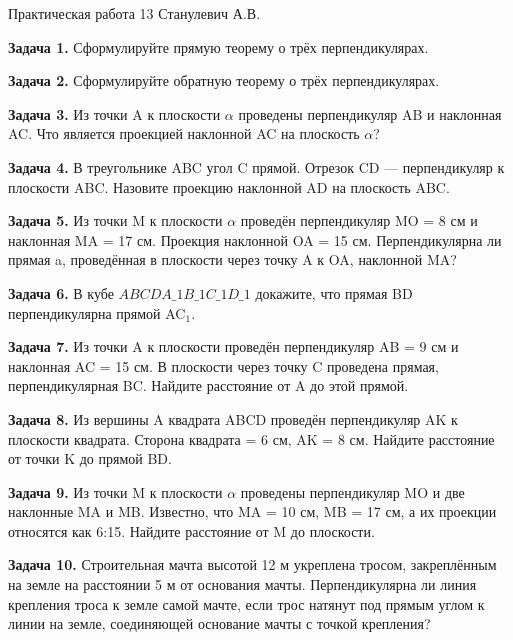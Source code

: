 \documentclass{umk-matematika}
\begin{document}
\maketitlepage
    {Практическая работа 13}
    {}
    {Станулевич А.В.}

\textbf{Задача 1.} Сформулируйте прямую теорему о трёх перпендикулярах.\par\vspace{10pt}
\textbf{Задача 2.} Сформулируйте обратную теорему о трёх перпендикулярах.\par\vspace{10pt}
\textbf{Задача 3.} Из точки A к плоскости $\alpha$ проведены перпендикуляр AB и наклонная AC. Что является проекцией наклонной AC на плоскость $\alpha$?\par\vspace{10pt}
\textbf{Задача 4.} В треугольнике ABC угол C прямой. Отрезок CD — перпендикуляр к плоскости ABC. Назовите проекцию наклонной AD на плоскость ABC.\par\vspace{10pt}
\textbf{Задача 5.} Из точки M к плоскости $\alpha$ проведён перпендикуляр MO = 8 см и наклонная MA = 17 см. Проекция наклонной OA = 15 см. Перпендикулярна ли прямая a, проведённая в плоскости через точку A к OA, наклонной MA?\par\vspace{10pt}
\textbf{Задача 6.} В кубе $ABCDA\_1B\_1C\_1D\_1$ докажите, что прямая BD перпендикулярна прямой AC$_1$.\par\vspace{10pt}
\textbf{Задача 7.} Из точки A к плоскости проведён перпендикуляр AB = 9 см и наклонная AC = 15 см. В плоскости через точку C проведена прямая, перпендикулярная BC. Найдите расстояние от A до этой прямой.\par\vspace{10pt}
\textbf{Задача 8.} Из вершины A квадрата ABCD проведён перпендикуляр AK к плоскости квадрата. Сторона квадрата = 6 см, AK = 8 см. Найдите расстояние от точки K до прямой BD.\par\vspace{10pt}
\textbf{Задача 9.} Из точки M к плоскости $\alpha$ проведены перпендикуляр MO и две наклонные MA и MB. Известно, что MA = 10 см, MB = 17 см, а их проекции относятся как 6:15. Найдите расстояние от M до плоскости.\par\vspace{10pt}
\textbf{Задача 10.} Строительная мачта высотой 12 м укреплена тросом, закреплённым на земле на расстоянии 5 м от основания мачты. Перпендикулярна ли линия крепления троса к земле самой мачте, если трос натянут под прямым углом к линии на земле, соединяющей основание мачты с точкой крепления?\par\vspace{10pt}
\newpage
\end{document}
